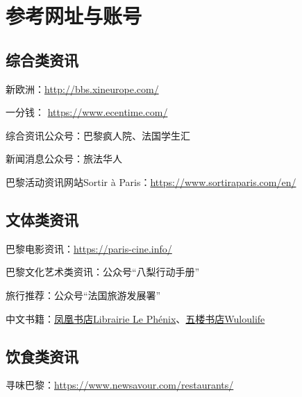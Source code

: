 \section{参考网址与账号}

\subsection{综合类资讯}
新欧洲：\href{http://bbs.xineurope.com/}{http://bbs.xineurope.com/} 

一分钱： \href{https://www.ecentime.com/}{https://www.ecentime.com/} 

综合资讯公众号：巴黎疯人院、法国学生汇

新闻消息公众号：旅法华人

巴黎活动资讯网站Sortir à Paris：\href{https://www.sortiraparis.com/en/}{https://www.sortiraparis.com/en/}

\subsection{文体类资讯}

巴黎电影资讯：\href{https://paris-cine.info/}{https://paris-cine.info/}

巴黎文化艺术类资讯：公众号“八梨行动手册”

旅行推荐：公众号“法国旅游发展署”

中文书籍：\href{https://www.librairielephenix.fr/}{凤凰书店Librairie Le Phénix}、\href{https://wulolife.com/}{五楼书店Wuloulife}

\subsection{饮食类资讯}

寻味巴黎：\href{https://www.newsavour.com/restaurants/}{https://www.newsavour.com/restaurants/}
